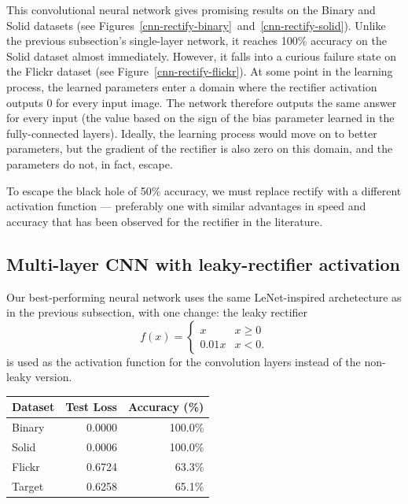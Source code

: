 \documentclass{article}
\newcommand{\dataset}[1]{\textsf{#1}}
\begin{document}
    This convolutional neural network gives promising results on the \dataset{Binary} and \dataset{Solid} datasets (see Figures~\ref{cnn-rectify-binary}~and~\ref{cnn-rectify-solid}). Unlike the previous subsection's single-layer network, it reaches 100\% accuracy on the \dataset{Solid} dataset almost immediately. However, it falls into a curious failure state on the \dataset{Flickr} dataset (see Figure~\ref{cnn-rectify-flickr}). At some point in the learning process, the learned parameters enter a domain where the rectifier activation outputs $0$ for every input image. The network therefore outputs the same answer for every input (the value based on the sign of the bias parameter learned in the fully-connected layers). Ideally, the learning process would move on to better parameters, but the gradient of the rectifier is also zero on this domain, and the parameters do not, in fact, escape.

    To escape the black hole of 50\% accuracy, we must replace rectify with a different activation function --- preferably one with similar advantages in speed and accuracy that has been observed for the rectifier in the literature.



  \subsection{Multi-layer CNN with leaky-rectifier activation}

    Our best-performing neural network uses the same LeNet-inspired archetecture as in the previous subsection, with one change: the leaky rectifier
    \[ f(x) = \begin{cases} x & x \geq 0 \\ 0.01 x & x < 0. \end{cases} \]
    is used as the activation function for the convolution layers instead of the non-leaky version.

    \begin{table}[ht]
      \centering
      \begin{tabular}{lrr}\toprule
        \textbf{Dataset} & \textbf{Test Loss} & \textbf{Accuracy (\%)}\\\midrule
        \dataset{Binary} & 0.0000 & 100.0\% \\ %
        \dataset{Solid}  & 0.0006 & 100.0\% \\ %
        \dataset{Flickr} & 0.6724 &  63.3\% \\ %
        \dataset{Target} & 0.6258 &  65.1\% \\ %
        \bottomrule
      \end{tabular}
    \end{table}
\end{document}
